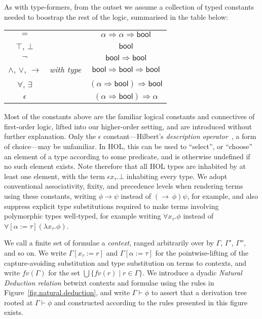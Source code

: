 \documentclass[a4paper, UKenglish, cleveref, autoref, thm-restate, colorlinks]{lipics-v2021}
\newcommand{\eps}[1]{\epsilon{#1}.}
\newcommand{\fall}[1]{\forall{#1}.}
\newcommand{\lam}[1]{\lambda{#1}.}
\begin{document}
As with type-formers, from the outset we assume a collection of typed constants needed to boostrap the rest of the logic, summarised in the table below:
\begin{center}
\begin{tabular}{ccc}
$=$ & & $\alpha \Rightarrow \alpha \Rightarrow \mathsf{bool}$ \\
$\top$, $\bot$ & & $\mathsf{bool}$ \\
$\neg$ & & $\mathsf{bool} \Rightarrow \mathsf{bool}$ \\
$\wedge$, $\vee$, $\longrightarrow$ & \emph{with type} & $\mathsf{bool} \Rightarrow \mathsf{bool} \Rightarrow \mathsf{bool}$ \\
$\forall$, $\exists$ & & $(\alpha \Rightarrow \mathsf{bool}) \Rightarrow \mathsf{bool}$ \\
$\epsilon$ & & $(\alpha \Rightarrow \mathsf{bool}) \Rightarrow \mathsf{\alpha}$
\end{tabular}
\end{center}
Most of the constants above are the familiar logical constants and connectives of first-order logic, lifted into our higher-order setting, and are introduced without further explanation.
Only the $\epsilon$ constant---Hilbert's \emph{description operator}~\cite{DBLP:conf/csl/MoserZ03}, a form of choice---may be unfamiliar.
In HOL, this can be used to ``select'', or ``choose'' an element of a type according to some predicate, and is otherwise undefined if no such element exists.
Note therefore that all HOL types are inhabited by at least one element, with the term $\eps{x_\tau}\bot$ inhabiting every type.
We adopt conventional associativity, fixity, and precedence levels when rendering terms using these constants, writing $\phi \longrightarrow \psi$ instead of $(\longrightarrow\ \phi)\psi$, for example, and also suppress explicit type substitutions required to make terms involving polymorphic types well-typed, for example writing $\fall{x_\tau}\phi$ instead of $\forall[\alpha := \tau](\lam{x_\tau}\phi)$.

We call a finite set of formulae a \emph{context}, ranged arbitrarily over by $\Gamma$, $\Gamma'$, $\Gamma''$, and so on.
We write $\Gamma[x_\tau := r]$ and $\Gamma[\alpha := \tau]$ for the pointwise-lifting of the capture-avoiding substitution and type substitution on terms to contexts, and write $fv(\Gamma)$ for the set $\bigcup \{ fv(r) \mid r \in \Gamma \}$.
We introduce a dyadic \emph{Natural Deduction relation} betwixt contexts and formulae using the rules in Figure~\ref{fig.natural.deduction}, and write $\Gamma \vdash \phi$ to assert that a derivation tree rooted at $\Gamma \vdash \phi$ and constructed according to the rules presented in this figure exists.
\end{document}
